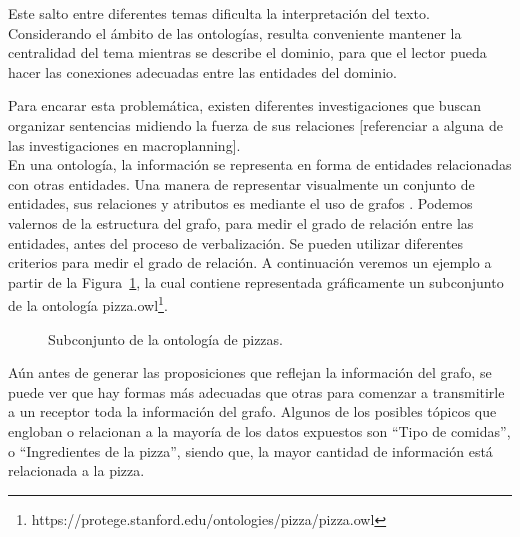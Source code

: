 Este salto entre diferentes temas dificulta la interpretación del texto. Considerando el ámbito de las ontologías, resulta conveniente mantener la centralidad del tema mientras se describe el dominio, para que el lector pueda hacer las conexiones adecuadas entre las entidades del dominio.

Para encarar esta problemática, existen diferentes investigaciones que buscan organizar sentencias midiendo la fuerza de sus relaciones [referenciar a alguna de las investigaciones en macroplanning]. 
\\

En una ontología, la información se representa en forma de entidades relacionadas con otras entidades. Una manera de representar visualmente un conjunto de entidades, sus relaciones y atributos es mediante el uso de grafos \cite{escarza2005visualizacion}. Podemos valernos de la estructura del grafo, para medir el grado de relación entre las entidades, antes del proceso de verbalización. Se pueden utilizar diferentes criterios para medir el grado de relación. A continuación veremos un ejemplo a partir de la Figura~\ref{fig:pizza.owl}, la cual contiene representada gráficamente un subconjunto de la ontología pizza.owl\footnote{https://protege.stanford.edu/ontologies/pizza/pizza.owl}.

\begin{figure}
\centering
{}
\caption{Subconjunto de la ontología de pizzas.} \label{fig:pizza.owl}
\end{figure}

Aún antes de generar las proposiciones que reflejan la información del grafo, se puede ver que hay formas más adecuadas que otras para comenzar a transmitirle a un receptor toda la información del grafo. Algunos de los posibles tópicos que engloban o relacionan a la mayoría de los datos expuestos son ``Tipo de comidas'', o ``Ingredientes de la pizza'', siendo que, la mayor cantidad de información está relacionada a la pizza. 


